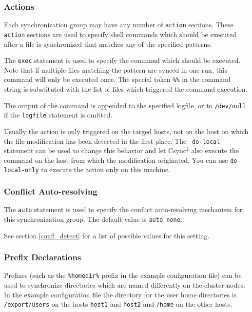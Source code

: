 \documentclass[a4paper,twocolumn]{article}
\def\csync2{{\sc Csync$^{2}$}}
\begin{document}
\subsubsection{Actions}

Each synchronization group may have any number of {\tt action} sections. These
{\tt action} sections are used to specify shell commands which should be
executed after a file is synchronized that matches any of the specified
patterns.

The {\tt exec} statement is used to specify the command which should be
executed. Note that if multiple files matching the pattern are synced in one
run, this command will only be executed once. The special token {\tt \%\%} in
the command string is substituted with the list of files which triggered the
command execution.

The output of the command is appended to the specified logfile, or to
{\tt /dev/null} if the {\tt logfile} statement is omitted.

Usually the action is only triggered on the targed hosts, not on the host on
which the file modification has been detected in the first place. The {\tt
do-local} statement can be used to change this behavior and let \csync2 also
execute the command on the host from which the modification originated. You can 
use {\tt do-local-only} to execute the action only on this machine.

\subsubsection{Conflict Auto-resolving}

The {\tt auto} statement is used to specify the conflict auto-resolving
mechanism for this synchronization group. The default value is {\tt auto none}.

See section \ref{confl_detect} for a list of possible values for this setting.

\subsubsection{Prefix Declarations}

Prefixes (such as the {\tt \%homedir\%} prefix in the example configuration
file) can be used to synchronize directories which are named differently on
the cluster nodes. In the example configuration file the directory for the
user home directories is {\tt /export/users} on the hosts {\tt host1} and
{\tt host2} and {\tt /home} on the other hosts.
\end{document}
